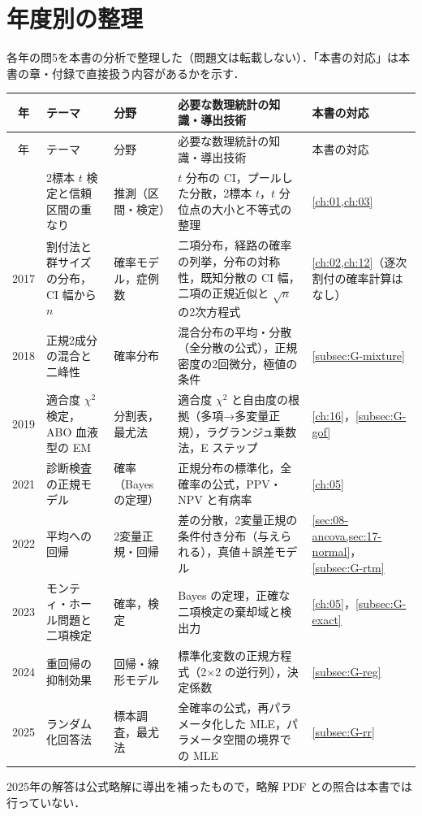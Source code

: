 \documentclass[a4paper,11pt,openany]{ltjsbook}
\begin{document}
\section{年度別の整理}\label{sec:G-years}
各年の問5を本書の分析で整理した（問題文は転載しない）．「本書の対応」は本書の章・付録で直接扱う内容があるかを示す．
\begin{center}\scriptsize
\setlength{\tabcolsep}{3pt}
\begin{longtable}{@{}cL{30mm}L{30mm}L{48mm}L{22mm}@{}}
\toprule
年 & テーマ & 分野 & 必要な数理統計の知識・導出技術 & 本書の対応\\
\midrule
\endfirsthead
\toprule
年 & テーマ & 分野 & 必要な数理統計の知識・導出技術 & 本書の対応\\
\midrule
\endhead
\bottomrule
{} & 2標本 $t$ 検定と信頼区間の重なり & 推測（区間・検定） & $t$ 分布の CI，プールした分散，2標本 $t$，$t$ 分位点の大小と不等式の整理 & \cref{ch:01,ch:03}\\
2017 & 割付法と群サイズの分布，CI 幅から $n$ & 確率モデル，症例数 & 二項分布，経路の確率の列挙，分布の対称性，既知分散の CI 幅，二項の正規近似と $\sqrt n$ の2次方程式 & \cref{ch:02,ch:12}（逐次割付の確率計算はなし）\\
2018 & 正規2成分の混合と二峰性 & 確率分布 & 混合分布の平均・分散（全分散の公式），正規密度の2回微分，極値の条件 & \cref{subsec:G-mixture}\\
2019 & 適合度 $\chi^2$ 検定，ABO 血液型の EM & 分割表，最尤法 & 適合度 $\chi^2$ と自由度の根拠（多項→多変量正規），ラグランジュ乗数法，E ステップ & \cref{ch:16}，\cref{subsec:G-gof}\\
2021 & 診断検査の正規モデル & 確率（Bayes の定理） & 正規分布の標準化，全確率の公式，PPV・NPV と有病率 & \cref{ch:05}\\
2022 & 平均への回帰 & 2変量正規・回帰 & 差の分散，2変量正規の条件付き分布（与えられる），真値＋誤差モデル & \cref{sec:08-ancova,sec:17-normal}，\cref{subsec:G-rtm}\\
2023 & モンティ・ホール問題と二項検定 & 確率，検定 & Bayes の定理，正確な二項検定の棄却域と検出力 & \cref{ch:05}，\cref{subsec:G-exact}\\
2024 & 重回帰の抑制効果 & 回帰・線形モデル & 標準化変数の正規方程式（2×2 の逆行列），決定係数 & \cref{subsec:G-reg}\\
2025 & ランダム化回答法 & 標本調査，最尤法 & 全確率の公式，再パラメータ化した MLE，パラメータ空間の境界での MLE & \cref{subsec:G-rr}\\
\end{longtable}
\end{center}
2025年の解答は公式略解に導出を補ったもので，略解 PDF との照合は本書では行っていない．
\end{document}
